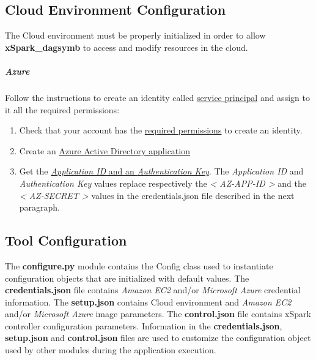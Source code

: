 \hypertarget{cloud-environment-configuration}{%
\subsection{Cloud Environment
	Configuration}\label{cloud-environment-configuration}}

The Cloud environment must be properly initialized in order to allow
\textbf{xSpark\_dagsymb} to access and modify resources in the cloud.

\hypertarget{azure}{%
\subparagraph{Azure}\label{azure}}

Follow the instructions to create an identity called
\href{https://docs.microsoft.com/en-us/azure/azure-resource-manager/resource-group-create-service-principal-portal}{service
principal} and assign to it all the required permissions:

\begin{enumerate}
\def\labelenumi{\arabic{enumi})}
\item
Check that your account has the
\href{https://docs.microsoft.com/en-us/azure/azure-resource-manager/resource-group-create-service-principal-portal?view=azure-cli-latest\#required-permissions}{required
	permissions} to create an identity.
\item
Create an
\href{https://docs.microsoft.com/en-us/azure/azure-resource-manager/resource-group-create-service-principal-portal?view=azure-cli-latest\#create-an-azure-active-directory-application}{Azure
	Active Directory application}
\item
Get the
\href{https://docs.microsoft.com/en-us/azure/azure-resource-manager/resource-group-create-service-principal-portal?view=azure-cli-latest\#get-application-id-and-authentication-key}{\emph{Application
		ID} and an \emph{Authentication Key}}. The \emph{Application ID} and
\emph{Authentication Key} values replace respectively the
\emph{\textless{} AZ-APP-ID \textgreater{}} and the \emph{\textless{}
	AZ-SECRET \textgreater{}} values in the credentials.json file
described in the next paragraph.
\end{enumerate}

\hypertarget{tool-configuration}{%
\subsection{Tool Configuration}\label{tool-configuration}}

The \textbf{configure.py} module contains the Config class used to
instantiate configuration objects that are initialized with default
values. The \textbf{credentials.json} file contains \emph{Amazon EC2}
and/or \emph{Microsoft Azure} credential information. The
\textbf{setup.json} contains Cloud environment and \emph{Amazon EC2}
and/or \emph{Microsoft Azure} image parameters. The
\textbf{control.json} file contains xSpark controller configuration
parameters. Information in the \textbf{credentials.json},
\textbf{setup.json} and \textbf{control.json} files are used to
customize the configuration object used by other modules during the
application execution.

